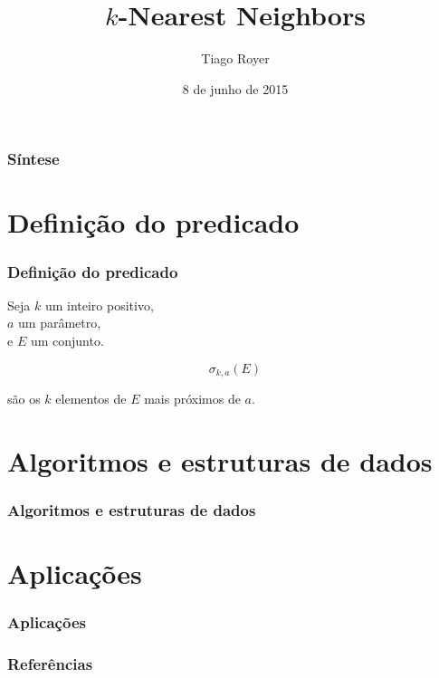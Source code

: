 \documentclass[utf8]{beamer}
\begin{document}
\author{Tiago Royer}
\title{$k$-Nearest Neighbors}
\date{8 de junho de 2015}
\begin{frame}
    \titlepage
\end{frame}

\begin{frame}
    \frametitle{Síntese}
    \tableofcontents
\end{frame}

\section{Definição do predicado}

\begin{frame}
    \frametitle{Definição do predicado}

    Seja $k$ um inteiro positivo,\\
    $a$ um parâmetro,\\
    e $E$ um conjunto.

    \begin{equation*}
        \sigma_{k, a}(E)
    \end{equation*}

    são os $k$ elementos de $E$ mais próximos de $a$.
    \nocite{two-kNN-predicates}
\end{frame}

\section{Algoritmos e estruturas de dados}

\begin{frame}
    \frametitle{Algoritmos e estruturas de dados}
\end{frame}

\section{Aplicações}
\begin{frame}
    \frametitle{Aplicações}
\end{frame}

\begin{frame}
    \frametitle{Referências}
    
    
\end{frame}
\end{document}
